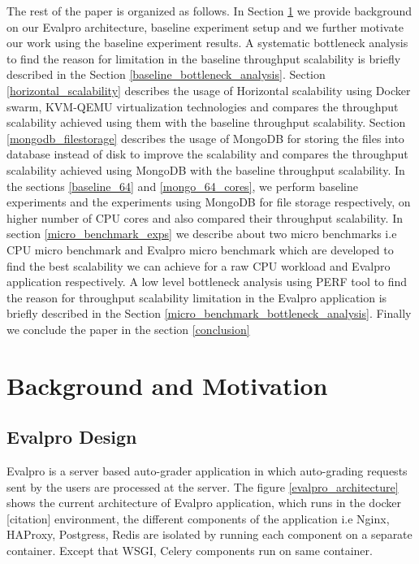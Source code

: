 \documentclass[sigconf]{acmart}
\begin{document}
The rest of the paper is organized as follows. In Section \ref{motivation_background} we provide background on our Evalpro architecture, baseline experiment setup and we further motivate our work using the baseline experiment results. A systematic bottleneck analysis to find the reason for limitation in the baseline throughput scalability is briefly described in the Section \ref{baseline_bottleneck_analysis}. Section \ref{horizontal_scalability} describes the usage of Horizontal scalability using Docker swarm, KVM-QEMU virtualization technologies and compares the throughput scalability achieved using them with the baseline throughput scalability. Section \ref{mongodb_filestorage} describes the usage of MongoDB for storing the files into database instead of disk to improve the scalability and compares the throughput scalability achieved using MongoDB with the baseline throughput scalability. In the sections \ref{baseline_64} and \ref{mongo_64_cores},  we perform baseline experiments and the experiments using MongoDB for file storage respectively, on higher number of CPU cores and also compared their throughput scalability. In section \ref{micro_benchmark_exps} we describe about two micro benchmarks i.e CPU micro benchmark and Evalpro micro benchmark which are developed to find the best scalability we can achieve for a raw CPU workload and Evalpro application respectively. A low level bottleneck analysis using PERF tool to find the reason for throughput scalability limitation in the Evalpro application is briefly described in the Section \ref{micro_benchmark_bottleneck_analysis}. Finally we conclude the paper in the section \ref{conclusion}


\section{Background and Motivation} \label{motivation_background}
\subsection{Evalpro Design}
Evalpro is a server based auto-grader application in which auto-grading requests sent by the users are processed at the server. The figure \ref{evalpro_architecture} shows the current architecture of Evalpro application, which runs in the docker [citation] environment, the different components of the application i.e Nginx, HAProxy, Postgress, Redis are isolated by running each component on a separate container. Except that WSGI, Celery components run on same container.
\end{document}
